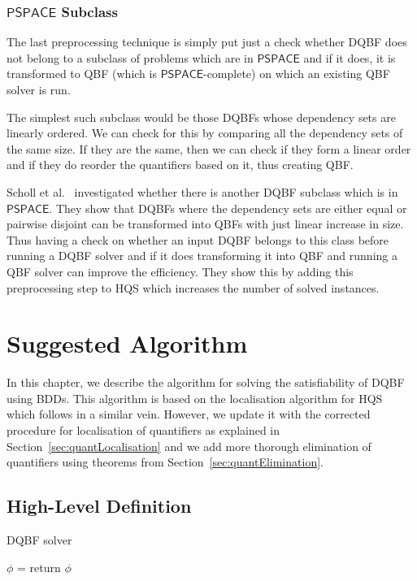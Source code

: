 \documentclass[
  digital, %
  color,
  twoside, %
  table,   %
  nolof,     %
  nolot,     %
]{fithesis3}
\theoremstyle{definition}
\theoremstyle{remark}
\newcommand{\ComplexityFont}[1]{\mathsf{#1}}
\newcommand{\PSPACE}{\ComplexityFont{PSPACE}}
\begin{document}
\subsection{\texorpdfstring{$\PSPACE$}{PSPACE} Subclass}
\label{sec:prepro:pspacesubclass}
The last preprocessing technique is simply put just a check whether DQBF does not belong to a subclass of problems which are in $\PSPACE$ and if it does, it is transformed to QBF (which is $\PSPACE$-complete) on which an existing QBF solver is run.

The simplest such subclass would be those DQBFs whose dependency sets are linearly ordered. We can check for this by comparing all the dependency sets of the same size. If they are the same, then we can check if they form a linear order and if they do reorder the quantifiers based on it, thus creating QBF.

Scholl et al.~\cite{PSPACEsubclass} investigated whether there is another DQBF subclass which is in $\PSPACE$. They show that DQBFs where the dependency sets are either equal or pairwise disjoint can be transformed into QBFs with just linear increase in size. Thus having a check on whether an input DQBF belongs to this class before running a DQBF solver and if it does transforming it into QBF and running a QBF solver can improve the efficiency. They show this by adding this preprocessing step to HQS which increases the number of solved instances.

\chapter{Suggested Algorithm}
\label{chap:algorithm}
In this chapter, we describe the algorithm for solving the satisfiability of DQBF using BDDs. This algorithm is based on the localisation algorithm for HQS~\cite{HQSquantifierLocalisation} which follows in a similar vein. However, we update it with the corrected procedure for localisation of quantifiers as explained in Section~\ref{sec:quantLocalisation} and we add more thorough elimination of quantifiers using theorems from Section~\ref{sec:quantElimination}.

\section{High-Level Definition}
\begin{algorithm}
  \caption{DQBF solver}
  \label{alg:general}
  \begin{algorithmic}[1]
    \State {}
    \State $\phi$ = 
    \State {} \label{alg:general:elimination}
    \State return $\phi$
    \EndFunction
  \end{algorithmic}
\end{algorithm}
\end{document}
